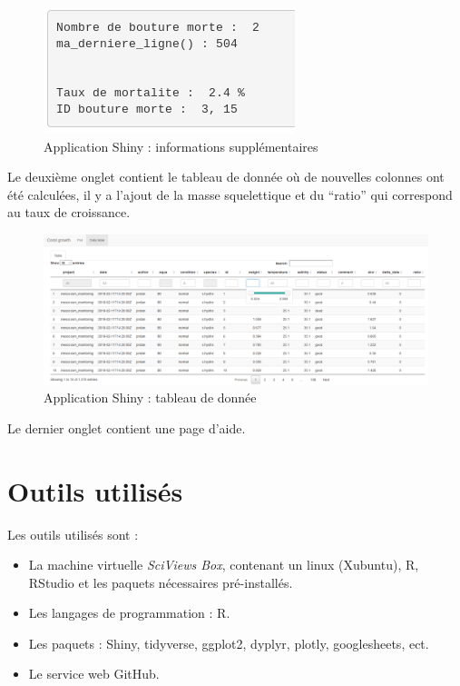 \documentclass[]{report}
\begin{document}
\begin{figure}[h!]
\includegraphics[]{../image/shiny7.PNG}
\caption{Application Shiny : informations supplémentaires}
\end{figure}

Le deuxième onglet contient le tableau de donnée où de nouvelles
colonnes ont été calculées, il y a l'ajout de la masse squelettique et
du ``ratio'' qui correspond au taux de croissance.

\begin{figure}[h!]
\includegraphics[]{../image/notebook-table1.png}
\caption{Application Shiny : tableau de donnée}
\end{figure}

Le dernier onglet contient une page d'aide.

\section{Outils utilisés}\label{outils-utilises}

Les outils utilisés sont :

\begin{itemize}
\item
  La machine virtuelle \emph{SciViews Box}, contenant un linux
  (Xubuntu), R, RStudio et les paquets nécessaires pré-installés.
\item
  Les langages de programmation : R.
\item
  Les paquets : Shiny, tidyverse, ggplot2, dyplyr, plotly, googlesheets,
  ect.
\item
  Le service web GitHub.
\end{itemize}
\end{document}
